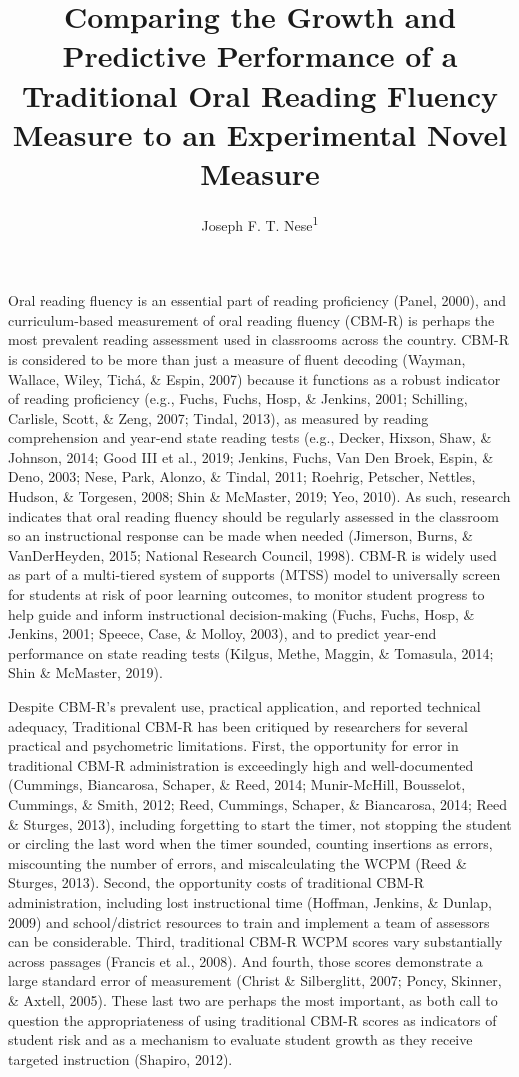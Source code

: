 \documentclass[
  english,
  man, fleqn, noextraspace]{apa6}
\title{Comparing the Growth and Predictive Performance of a Traditional Oral Reading Fluency Measure to an Experimental Novel Measure}
\author{Joseph F. T. Nese\textsuperscript{1}}
\date{}
\affiliation{\vspace{0.5cm}\textsuperscript{1} University of Oregon}
\begin{document}
\maketitle

Oral reading fluency is an essential part of reading proficiency (Panel, 2000), and curriculum-based measurement of oral reading fluency (CBM-R) is perhaps the most prevalent reading assessment used in classrooms across the country. CBM-R is considered to be more than just a measure of fluent decoding (Wayman, Wallace, Wiley, Tichá, \& Espin, 2007) because it functions as a robust indicator of reading proficiency (e.g., Fuchs, Fuchs, Hosp, \& Jenkins, 2001; Schilling, Carlisle, Scott, \& Zeng, 2007; Tindal, 2013), as measured by reading comprehension and year-end state reading tests (e.g., Decker, Hixson, Shaw, \& Johnson, 2014; Good III et al., 2019; Jenkins, Fuchs, Van Den Broek, Espin, \& Deno, 2003; Nese, Park, Alonzo, \& Tindal, 2011; Roehrig, Petscher, Nettles, Hudson, \& Torgesen, 2008; Shin \& McMaster, 2019; Yeo, 2010). As such, research indicates that oral reading fluency should be regularly assessed in the classroom so an instructional response can be made when needed (Jimerson, Burns, \& VanDerHeyden, 2015; National Research Council, 1998). CBM-R is widely used as part of a multi-tiered system of supports (MTSS) model to universally screen for students at risk of poor learning outcomes, to monitor student progress to help guide and inform instructional decision-making (Fuchs, Fuchs, Hosp, \& Jenkins, 2001; Speece, Case, \& Molloy, 2003), and to predict year-end performance on state reading tests (Kilgus, Methe, Maggin, \& Tomasula, 2014; Shin \& McMaster, 2019).

Despite CBM-R's prevalent use, practical application, and reported technical adequacy, Traditional CBM-R has been critiqued by researchers for several practical and psychometric limitations. First, the opportunity for error in traditional CBM-R administration is exceedingly high and well-documented (Cummings, Biancarosa, Schaper, \& Reed, 2014; Munir-McHill, Bousselot, Cummings, \& Smith, 2012; Reed, Cummings, Schaper, \& Biancarosa, 2014; Reed \& Sturges, 2013), including forgetting to start the timer, not stopping the student or circling the last word when the timer sounded, counting insertions as errors, miscounting the number of errors, and miscalculating the WCPM (Reed \& Sturges, 2013). Second, the opportunity costs of traditional CBM-R administration, including lost instructional time (Hoffman, Jenkins, \& Dunlap, 2009) and school/district resources to train and implement a team of assessors can be considerable. Third, traditional CBM-R WCPM scores vary substantially across passages (Francis et al., 2008). And fourth, those scores demonstrate a large standard error of measurement (Christ \& Silberglitt, 2007; Poncy, Skinner, \& Axtell, 2005). These last two are perhaps the most important, as both call to question the appropriateness of using traditional CBM-R scores as indicators of student risk and as a mechanism to evaluate student growth as they receive targeted instruction (Shapiro, 2012).
\end{document}
